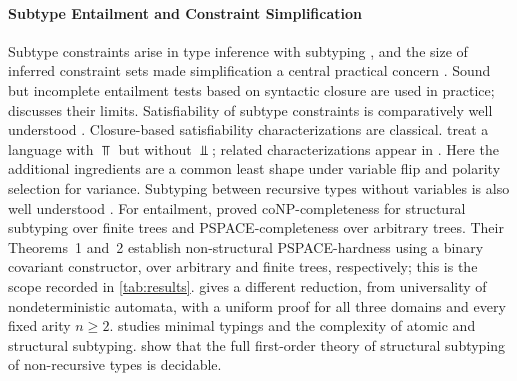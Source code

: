\paragraph{Subtype Entailment and Constraint Simplification}
Subtype constraints arise in type inference with subtyping
\citep{Mitchell91,FuhMishra90,AikenWimmers93,EifrigSmithTrifonov95,PalsbergWandOKeefe97},
and the size of inferred constraint sets made simplification a central practical concern
\citep{Pottier96,Pottier98thesis,Pottier01,TrifonovSmith96}. Sound but incomplete
entailment tests based on syntactic closure are used in practice; \citet{Pottier01} discusses
their limits. Satisfiability of subtype
constraints is comparatively well understood
\citep{Tiuryn92,PrattTiuryn96,Frey97,KozenPalsbergSchwartzbach94,PalsbergOKeefe95,PalsbergWandOKeefe97,Simonet03,NiehrenPriesnitzSu05}.
Closure-based satisfiability characterizations are classical.
\citet{KozenPalsbergSchwartzbach94} treat a language with $\Top$ but
without $\Bot$; related characterizations appear in
\citet{PalsbergOKeefe95,PalsbergWandOKeefe97}.
Here the additional ingredients are a common least shape under variable flip
and polarity selection for variance. Subtyping between recursive types without variables
is also well understood
\citep{AmadioCardelli93,KozenPalsbergSchwartzbach95}. For entailment, \citet{HengleinRehof97} proved coNP-completeness for structural subtyping over
finite trees and \citet{HengleinRehof98} PSPACE-completeness over arbitrary trees. Their Theorems~1 and~2 establish
non-structural PSPACE-hardness using a binary covariant constructor, over
arbitrary and finite trees, respectively; this is the scope recorded in
\cref{tab:results}.  gives a different reduction, from
universality of nondeterministic automata, with a uniform proof for all three
domains and every fixed arity $n\ge2$. \citet{Rehof97,Rehof98thesis} studies
minimal typings and the complexity of atomic and structural subtyping.
\citet{KuncakRinard03} show that the full first-order theory of structural subtyping of
non-recursive types is decidable.

